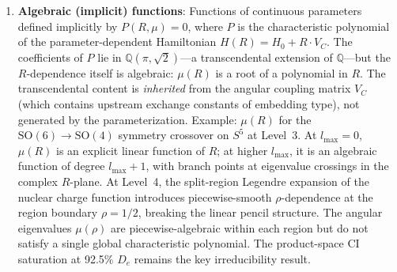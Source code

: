 \documentclass[aps,pra,twocolumn,superscriptaddress,longbibliography]{revtex4-2}
\begin{document}
\begin{enumerate}
    A \emph{distributional} sub-category appears in the Breit spin-spin
    interaction: the bare $1/r_{12}^3$ kernel diverges logarithmically
    at coalescence for every partial wave.  The Breit-Pauli tensor
    projection regularizes this, leaving $K_l^{BP} = r_<^l / r_>^{l+3}$
    with exact rational matrix elements for same-$n$ orbitals
    ($R_{BP}^2(2p,2p;2p,2p) = 7/768$ at $Z=1$).  For cross-$n$
    orbitals a new transcendental appears:
    $M_{\rm ret}^2(1s,2p;1s,2p) = 21344/729 - (10240/243)\log(2)$,
    the first $\log$-embedding constant in the framework.

    On the $S^3$ pair-state lattice (v2.9.1), 92--94\% of $V_{ee}$'s
    Frobenius mass is diagonal in the graph eigenbasis, with the
    off-diagonal residual concentrated on the $(1s,1s)$ coalescence
    pair-state.  The graph nearly diagonalizes $V_{ee}$ without
    containing $1/r_{12}$---direct evidence that the cusp is embedding
    content the graph cannot absorb, explaining the graph-native CI
    convergence floor (Paper~13, Track~DI).

  \item \textbf{Algebraic (implicit) functions}: Functions of
    continuous parameters defined implicitly by $P(R,\mu) = 0$,
    where $P$ is the characteristic polynomial of the
    parameter-dependent Hamiltonian $H(R) = H_0 + R \cdot V_C$.
    The coefficients of $P$ lie in $\mathbb{Q}(\pi, \sqrt{2})$---a
    transcendental extension of $\mathbb{Q}$---but the $R$-dependence
    itself is algebraic: $\mu(R)$ is a root of a polynomial in $R$.
    The transcendental content is \emph{inherited} from the angular
    coupling matrix $V_C$ (which contains upstream exchange constants
    of embedding type), not generated by the parameterization.
    Example: $\mu(R)$ for the $\mathrm{SO}(6) \to \mathrm{SO}(4)$
    symmetry crossover on $S^5$ at Level~3.  At $l_{\max} = 0$,
    $\mu(R)$ is an explicit linear function of $R$; at higher
    $l_{\max}$, it is an algebraic function of degree $l_{\max}+1$,
    with branch points at eigenvalue crossings in the complex
    $R$-plane.  At Level~4, the split-region Legendre expansion of
    the nuclear charge function introduces piecewise-smooth
    $\rho$-dependence at the region boundary $\rho = 1/2$, breaking
    the linear pencil structure. The angular eigenvalues $\mu(\rho)$
    are piecewise-algebraic within each region but do not satisfy a
    single global characteristic polynomial. The product-space CI
    saturation at 92.5\% $D_e$ remains the key irreducibility result.


\end{enumerate}
\end{document}
